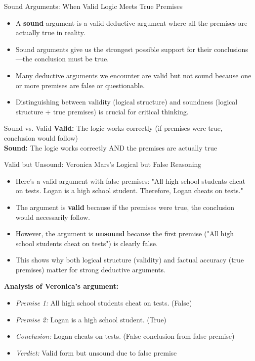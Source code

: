 \documentclass{beamer}
\begin{document}
\begin{frame}{Sound Arguments: When Valid Logic Meets True Premises}
	\begin{itemize}
		\item A \textbf{sound} argument is a valid deductive argument where all the premises are actually true in reality.
		\item Sound arguments give us the strongest possible support for their conclusions—the conclusion must be true.
		\item Many deductive arguments we encounter are valid but not sound because one or more premises are false or questionable.
		\item Distinguishing between validity (logical structure) and soundness (logical structure + true premises) is crucial for critical thinking.
	\end{itemize}
	
	\begin{alertblock}{Sound vs. Valid}
		\textbf{Valid:} The logic works correctly (if premises were true, conclusion would follow)
		\\[0.5em]
		\textbf{Sound:} The logic works correctly AND the premises are actually true
	\end{alertblock}
\end{frame}

\begin{frame}{Valid but Unsound: Veronica Mars's Logical but False Reasoning}
	\begin{itemize}
		\item Here's a valid argument with false premises: "All high school students cheat on tests. Logan is a high school student. Therefore, Logan cheats on tests."
		\item The argument is \textbf{valid} because if the premises were true, the conclusion would necessarily follow.
		\item However, the argument is \textbf{unsound} because the first premise ("All high school students cheat on tests") is clearly false.
		\item This shows why both logical structure (validity) and factual accuracy (true premises) matter for strong deductive arguments.
	\end{itemize}
	
	\begin{example}
		\scriptsize
		\textbf{Analysis of Veronica's argument:}
		\begin{itemize}
			\item \textit{Premise 1:} All high school students cheat on tests. (False)
			\item \textit{Premise 2:} Logan is a high school student. (True)
			\item \textit{Conclusion:} Logan cheats on tests. (False conclusion from false premise)
			\item \textit{Verdict:} Valid form but unsound due to false premise
		\end{itemize}
		\end{example}
\end{frame}
\end{document}
